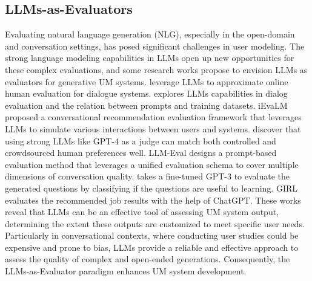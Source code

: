 \documentclass[11pt]{article}
\newcommand{\edit}[1]{\textcolor{blue}{#1}}
\newcommand{\comments}[1]{\textcolor{red}{[Re:~#1]}}
\begin{document}
\subsection{LLMs-as-Evaluators}
Evaluating natural language generation (NLG), especially in the open-domain and conversation settings, has posed significant challenges in user modeling. The strong language modeling capabilities in LLMs open up new opportunities for these complex evaluations, and some research works propose to envision LLMs as evaluators for generative UM systems.
\citet{svikhnushina2023approximating} leverage LLMs to approximate online human evaluation for dialogue systems. \citet{huynh2023understanding} explores LLMs capabilities in dialog evaluation and the relation between prompts and training datasets. iEvaLM \cite{wang2023rethinking} proposed a conversational recommendation evaluation framework that leverages LLMs to simulate various interactions between users and systems. \citet{zheng2023judging} discover that using strong LLMs like GPT-4 as a judge can match both controlled and crowdsourced human preferences well. LLM-Eval \cite{lin2023llm} designs a prompt-based evaluation method that leverages a unified evaluation schema to cover multiple dimensions of conversation quality. \citet{bhat2022towards} takes a fine-tuned GPT-3 to evaluate the generated questions by classifying if the questions are useful to learning. GIRL \cite{zheng2023generative} evaluates the recommended job results with the help of ChatGPT.
These works reveal that LLMs can be an effective tool of assessing UM system output, determining the extent these outputs are customized to meet specific user needs. Particularly in conversational contexts, where conducting user studies could be expensive and prone to bias, LLMs provide a reliable and effective approach to assess the quality of complex and open-ended generations. Consequently, the LLMs-as-Evaluator paradigm enhances UM system development.
\end{document}
